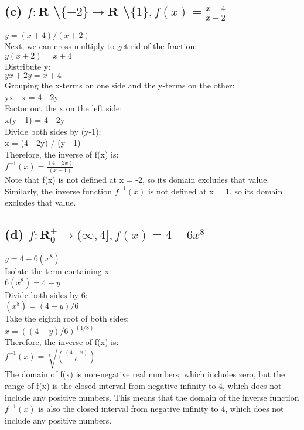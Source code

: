 \documentclass{article}
\begin{document}
\subsection{(c) $f:\mathbf{R}$ \textbackslash $\{ -2 \} \rightarrow \mathbf{R}$ \textbackslash $\{ 1 \}, f(x) = \frac{x+4}{x+2}$}
$y = (x+4)/(x+2)$\\
Next, we can cross-multiply to get rid of the fraction:\\
$y(x+2) = x+4$\\
Distribute y:\\
$yx + 2y = x + 4$\\
Grouping the x-terms on one side and the y-terms on the other:\\
yx - x = 4 - 2y\\
Factor out the x on the left side:\\
x(y - 1) = 4 - 2y\\
Divide both sides by (y-1):\\
x = (4 - 2y) / (y - 1)\\
Therefore, the inverse of f(x) is:\\
$f^{-1}(x) = \frac{(4 - 2x)}{(x - 1)}$\\
Note that f(x) is not defined at x = -2, so its domain excludes that value. Similarly, the inverse function $f^{-1}(x)$ is not defined at x = 1, so its domain excludes that value.\\

\subsection{(d) $f:\mathbf{R_0^{+}} \rightarrow (\infty,4] , f(x) = 4- 6x^8$}

$y = 4 - 6(x^8)$\\
Isolate the term containing x:\\
$6(x^8) = 4 - y$\\
Divide both sides by 6:\\
$(x^8) = (4 - y)/6$\\
Take the eighth root of both sides:\\
$x = ((4 - y)/6)^(1/8)$\\
Therefore, the inverse of f(x) is:\\
$f^{-1}(x) = \sqrt[8]{(\frac{(4 - x)}{6})}$\\

The domain of f(x) is non-negative real numbers, which includes zero, but the range of f(x) is the closed interval from negative infinity to 4, which does not include any positive numbers. This means that the domain of the inverse function $f^{-1}(x)$ is also the closed interval from negative infinity to 4, which does not include any positive numbers.\\
\end{document}
